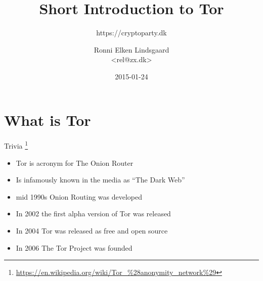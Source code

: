 \documentclass{beamer}
\title{Short Introduction to Tor}
\subtitle{https://cryptoparty.dk}
\author{Ronni Elken Lindsgaard \\ \textless rel@zx.dk\textgreater}
\date{2015-01-24}
\begin{document}
\begin{frame}
  \maketitle
\end{frame}

\begin{frame}
	\tableofcontents
\end{frame}

\section{What is Tor}
\begin{frame}
	\begin{block}{Trivia}
		\footnote{\url{https://en.wikipedia.org/wiki/Tor_\%28anonymity_network\%29}}
		\begin{itemize}
			\item Tor is acronym for The Onion Router
			\item Is infamously known in the media as ``The Dark Web''
			\item mid 1990s Onion Routing was developed
			\item In 2002 the first alpha version of Tor was released
			\item In 2004 Tor was released as free and open source
			\item In 2006 The Tor Project was founded
		\end{itemize}
	\end{block}

\end{frame}
\end{document}
